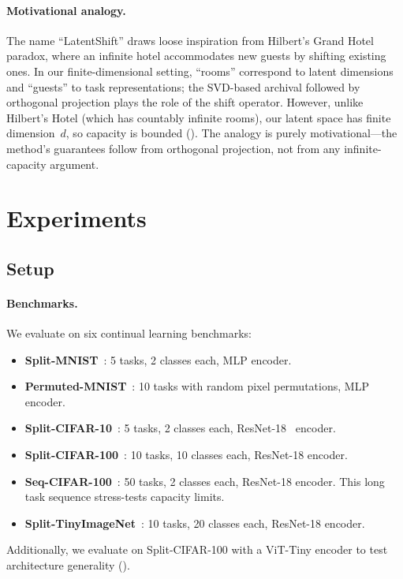 \documentclass{article}
\begin{document}
\paragraph{Motivational analogy.}
The name ``LatentShift'' draws loose inspiration from Hilbert's Grand Hotel
paradox, where an infinite hotel accommodates new guests by shifting existing
ones. In our finite-dimensional setting, ``rooms'' correspond to latent
dimensions and ``guests'' to task representations; the SVD-based archival
followed by orthogonal projection plays the role of the shift operator.
However, unlike Hilbert's Hotel (which has countably infinite rooms), our
latent space has finite dimension~$d$, so capacity is bounded
(). The analogy is purely motivational---the method's
guarantees follow from orthogonal projection, not from any infinite-capacity
argument.



\section{Experiments}
\label{sec:experiments}

\subsection{Setup}

\paragraph{Benchmarks.}
We evaluate on six continual learning benchmarks:
\begin{itemize}
    \item \textbf{Split-MNIST}~\citep{lecun1998gradient}: 5 tasks, 2 classes each, MLP encoder.
    \item \textbf{Permuted-MNIST}~\citep{lecun1998gradient}: 10 tasks with random pixel permutations, MLP encoder.
    \item \textbf{Split-CIFAR-10}~\citep{krizhevsky2009learning}: 5 tasks, 2 classes each, ResNet-18~\citep{he2016deep} encoder.
    \item \textbf{Split-CIFAR-100}~\citep{krizhevsky2009learning}: 10 tasks, 10 classes each, ResNet-18 encoder.
    \item \textbf{Seq-CIFAR-100}~\citep{krizhevsky2009learning}: 50 tasks, 2 classes each, ResNet-18 encoder. This long task sequence stress-tests capacity limits.
    \item \textbf{Split-TinyImageNet}~\citep{le2015tiny}: 10 tasks, 20 classes each, ResNet-18 encoder.
\end{itemize}
Additionally, we evaluate on Split-CIFAR-100 with a ViT-Tiny encoder to
test architecture generality ().
\end{document}
